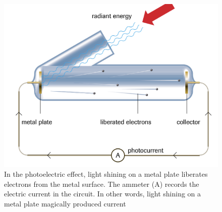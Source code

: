 \begin{figure}[ht!]
    \centering
    \includegraphics[width=\textwidth]{../figures/photoelectric-effect.png}
    \caption{In the photoelectric effect, light shining on a metal plate liberates electrons from
        the metal surface. The ammeter (A) records the electric current in the circuit. In other
        words, light shining on a metal plate magically produced current}
    \label{fig:photoelectric-effect}
\end{figure}
